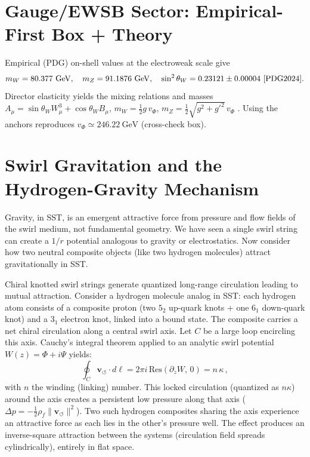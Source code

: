 \documentclass[10pt,reprint,aps,onecolumn,nofootinbib]{revtex4-2}
\newcommand{\vswirl}{\mathbf{v}_{\!\boldsymbol{\circlearrowleft}}}
\begin{document}
    \section{Gauge/EWSB Sector: Empirical-First Box + Theory}\label{canon58:gauge-openers}
    Empirical (PDG) on-shell values at the electroweak scale give
    \[
        m_W=80.377~\mathrm{GeV},\quad m_Z=91.1876~\mathrm{GeV},\quad \sin^2\theta_W=0.23121\pm0.00004 \ \cite{PDG2024}.
    \]
    Director elasticity yields the mixing relations and masses
    $A_\mu=\sin\theta_W W^3_\mu+\cos\theta_W B_\mu$,
    $m_W=\tfrac12 g\,v_\Phi$, $m_Z=\tfrac12\sqrt{g^2+g'^2}\,v_\Phi$ \cite{Weinberg1967,PeskinSchroeder1995}.
    Using the anchors reproduces $v_\Phi\simeq 246.22~\mathrm{GeV}$ (cross-check box). %



    \section{Swirl Gravitation and the Hydrogen-Gravity Mechanism}
    Gravity, in SST, is an emergent attractive force from pressure and flow fields of the swirl medium, not fundamental geometry. We have seen a single swirl string can create a $1/r$ potential analogous to gravity or electrostatics. Now consider how two neutral composite objects (like two hydrogen molecules) attract gravitationally in SST.

    \begin{tcolorbox}[title=Theorem 7.1: Hydrogen-Gravity Mechanism (Swirl Attraction in Flat Space)]
        Chiral knotted swirl strings generate quantized long-range circulation leading to mutual attraction. Consider a hydrogen molecule analog in SST: each hydrogen atom consists of a composite proton (two $5_2$ up-quark knots + one $6_1$ down-quark knot) and a $3_1$ electron knot, linked into a bound state. The composite carries a net chiral circulation along a central swirl axis. Let $C$ be a large loop encircling this axis. Cauchy’s integral theorem applied to an analytic swirl potential $W(z) = \Phi + i\Psi$ yields:
        \[
            \oint_C \vswirl \cdot d\ell = 2\pi i \,\text{Res}(\partial_z W,\,0) = n\,\kappa\,,
        \]
        with $n$ the winding (linking) number. This locked circulation (quantized as $n\kappa$) around the axis creates a persistent low pressure along that axis ($\Delta p = -\frac{1}{2}\rho_f \|\vswirl\|^2$). Two such hydrogen composites sharing the axis experience an attractive force as each lies in the other’s pressure well. The effect produces an inverse-square attraction between the systems (circulation field spreads cylindrically), entirely in flat space.
    \end{tcolorbox}
\end{document}
